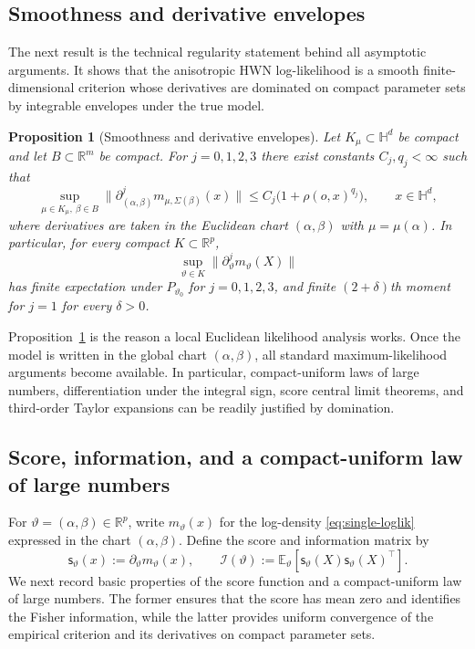 \documentclass[11pt]{article}
\newtheorem{proposition}[theorem]{Proposition}
\newcommand{\R}{\mathbb{R}}
\newcommand{\E}{\mathbb{E}}
\newcommand{\Hh}{\mathbb{H}}
\newcommand{\score}{\mathsf{s}}
\newcommand{\info}{\mathcal{I}}
\begin{document}
\subsection{Smoothness and derivative envelopes}

The next result is the technical regularity statement behind all asymptotic arguments. It shows that the anisotropic HWN log-likelihood is a smooth finite-dimensional criterion whose derivatives are dominated on compact parameter sets by integrable envelopes under the true model.

\begin{proposition}[Smoothness and derivative envelopes]
\label{prop:envelope}
Let $K_\mu\subset\Hh^d$ be compact and let $B\subset\R^m$ be compact. For $j=0,1,2,3$ there exist constants $C_j,q_j<\infty$ such that
\begin{equation}
\label{eq:envelope}
\sup_{\mu\in K_\mu,\ \beta\in B}
\bigl\|\partial_{(\alpha,\beta)}^j m_{\mu,\Sigma(\beta)}(x)\bigr\|
\le
C_j\bigl(1+\rho(o,x)^{q_j}\bigr),
\qquad x\in\Hh^d,
\end{equation}
where derivatives are taken in the Euclidean chart $(\alpha,\beta)$ with $\mu=\mu(\alpha)$.
In particular, for every compact $K\subset\R^p$,
\[
\sup_{\vartheta\in K}\bigl\|\partial_\vartheta^j m_\vartheta(X)\bigr\|
\]
has finite expectation under $P_{\vartheta_0}$ for $j=0,1,2,3$, and finite $(2+\delta)$th moment for $j=1$ for every $\delta>0$.
\end{proposition}


Proposition~\ref{prop:envelope} is the reason a local Euclidean likelihood analysis works. Once the model is written in the global chart $(\alpha,\beta)$, all standard maximum-likelihood arguments become available. In particular, compact-uniform laws of large numbers, differentiation under the integral sign, score central limit theorems, and third-order Taylor expansions can be readily justified by domination.


\subsection{Score, information, and a compact-uniform law of large numbers}

For $\vartheta=(\alpha,\beta)\in\R^p$, write $m_\vartheta(x)$ for the log-density \eqref{eq:single-loglik} expressed in the chart $(\alpha,\beta)$. Define the score and information matrix by
\[
\score_\vartheta(x):=\partial_\vartheta m_\vartheta(x),
\qquad
\info(\vartheta):=\E_\vartheta[\score_\vartheta(X)\score_\vartheta(X)^\top].
\]
We next record basic properties of the score function and a compact-uniform law of large numbers. The former ensures that the score has mean zero and identifies the Fisher information, while the latter provides uniform convergence of the empirical criterion and its derivatives on compact parameter sets.
\end{document}
